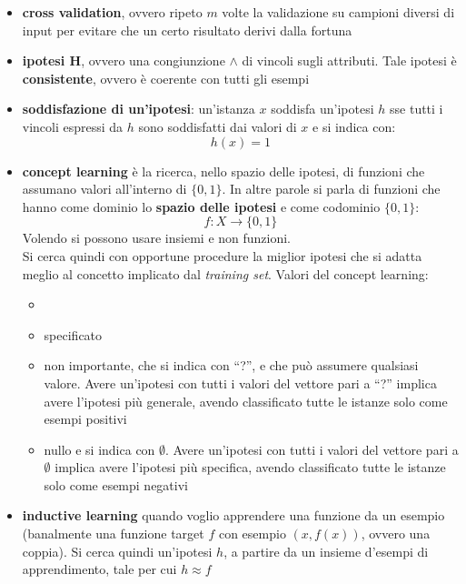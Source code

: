 \documentclass[a4paper,12pt, oneside]{article}
\begin{document}
\begin{itemize}
  \item \textbf{cross validation}, ovvero ripeto $m$ volte la validazione su
  campioni diversi di input per evitare che un certo risultato derivi dalla
  fortuna 
  \item \textbf{ipotesi H}, ovvero una congiunzione $\land$ di vincoli sugli
  attributi. Tale ipotesi è \textbf{consistente}, ovvero è coerente con tutti
  gli esempi
  \item \textbf{soddisfazione di un'ipotesi}: un'istanza $x$ soddisfa
  un'ipotesi $h$ sse tutti i vincoli espressi da $h$ sono soddisfatti dai
  valori di $x$ e si indica con:
  \[h(x)=1\]
  \item \textbf{concept learning} è la ricerca, nello spazio delle ipotesi,
  di funzioni che assumano valori all'interno di $\{0,1\}$. In altre parole si
  parla di funzioni che hanno come dominio lo \textbf{spazio delle ipotesi} e
  come codominio $\{0,1\}$:
  \[f:X\to\{0,1\}\]
  Volendo si possono usare insiemi e non funzioni.\\
  Si cerca quindi con opportune procedure la miglior ipotesi che si adatta
  meglio al concetto implicato dal \textit{training set}. Valori del concept
  learning:
  \begin{itemize}
    \item \item specificato
    \item non importante, che si indica con ``?'', e che può assumere
    qualsiasi valore. Avere un'ipotesi con tutti i valori del vettore pari a
    ``?'' implica avere l'ipotesi più generale, avendo classificato tutte le
    istanze solo come esempi positivi 
    \item nullo e si indica con $\emptyset$. Avere un'ipotesi con tutti i
    valori del vettore pari a $\emptyset$ implica avere l'ipotesi più
    specifica, avendo classificato tutte le istanze solo come esempi negativi
  \end{itemize}
  \item \textbf{inductive learning} quando voglio apprendere una funzione da
  un esempio (banalmente una funzione target $f$ con esempio $(x, f(x))$,
  ovvero una coppia). Si cerca quindi un'ipotesi $h$, a partire da un insieme
  d'esempi di apprendimento, tale per cui $h\approx f$
  

\end{itemize}
\end{document}
